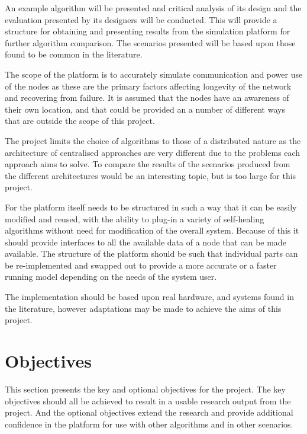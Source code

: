 \documentclass[authoryearcitations]{UoYCSproject}
\begin{document}
An example algorithm will be presented and critical analysis of its design and the evaluation presented by its designers will be conducted. This will provide a structure for obtaining and presenting results from the simulation platform for further algorithm comparison. The scenarios presented will be based upon those found to be common in the literature.

The scope of the platform is to accurately simulate communication and power use of the nodes as these are the primary factors affecting longevity of the network and recovering from failure. It is assumed that the nodes have an awareness of their own location, and that could be provided an a number of different ways that are outside the scope of this project.

The project limits the choice of algorithms to those of a distributed nature as the architecture of centralised approaches are very different due to the problems each approach aims to solve. To compare the results of the scenarios produced from the different architectures would be an interesting topic, but is too large for this project.

For the platform itself needs to be structured in such a way that it can be easily modified and reused, with the ability to plug-in a variety of self-healing algorithms without need for modification of the overall system. Because of this it should provide interfaces to all the available data of a node that can be made available. The structure of the platform should be such that individual parts can be re-implemented and swapped out to provide a more accurate or a faster running model depending on the needs of the system user.

The implementation should be based upon real hardware, and systems found in the literature, however adaptations may be made to achieve the aims of this project.

\section{Objectives}

This section presents the key and optional objectives for the project. The key objectives should all be achieved to result in a usable research output from the project. And the optional objectives extend the research and provide additional confidence in the platform for use with other algorithms and in other scenarios.
\end{document}
